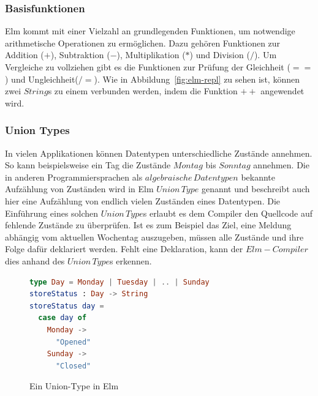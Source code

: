 \subsubsection{Basisfunktionen}
\label{sec:Basisfunktionen}
Elm kommt mit einer Vielzahl an grundlegenden Funktionen, um notwendige arithmetische Operationen zu ermöglichen. Dazu gehören Funktionen zur Addition ($+$), Subtraktion ($-$), Multiplikation ($*$) und Division ($/$). Um Vergleiche zu vollziehen gibt es die Funktionen zur Prüfung der Gleichheit ($==$) und Ungleichheit($/=$). Wie in Abbildung~\ref{fig:elm-repl} zu sehen ist, können zwei $String$s zu einem verbunden werden, indem die Funktion $++$ angewendet wird.

\subsubsection{Union Types}
\label{sec:Union-Types}
In vielen Applikationen können Datentypen unterschiedliche Zustände annehmen. So kann beispielsweise ein Tag die Zustände $Montag$ bis $Sonntag$ annehmen. Die in anderen Programmiersprachen als $algebraische\,Datentypen$\cite[Vgl.]{algebraische-datentypen} bekannte Aufzählung von Zuständen wird in Elm $Union\,Type$ genannt und beschreibt auch hier eine Aufzählung von endlich vielen Zuständen eines Datentypen. Die Einführung eines solchen $Union\,Type$s erlaubt es dem Compiler den Quellcode auf fehlende Zustände zu überprüfen. Ist es zum Beispiel das Ziel, eine Meldung abhängig vom aktuellen Wochentag auszugeben, müssen alle Zustände und ihre Folge dafür deklariert werden. Fehlt eine Deklaration, kann der $Elm-Compiler$ dies anhand des $Union\,Type$s erkennen.
\begin{figure}[h]
\begin{lstlisting}[language=Elm]
type Day = Monday | Tuesday | .. | Sunday
storeStatus : Day -> String
storeStatus day =
  case day of
    Monday ->
      "Opened"
    Sunday ->
      "Closed"
\end{lstlisting}
\caption{Ein Union-Type in Elm}\label{fig:elm-union-type}
\end{figure}
